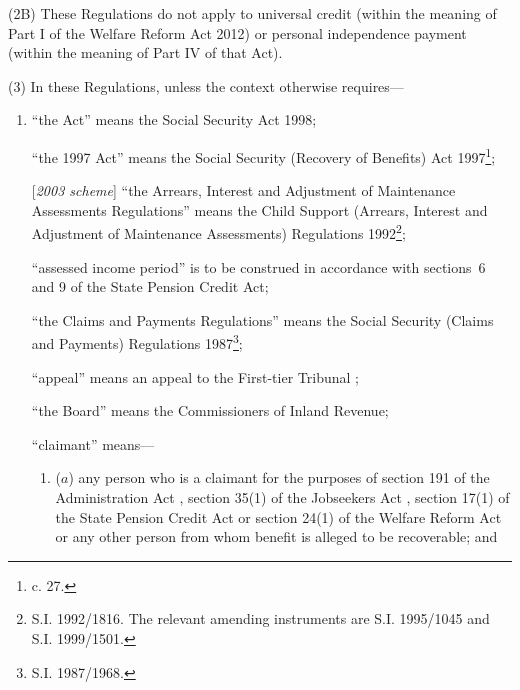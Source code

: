 \documentclass[12pt,a4paper]{article}
\begin{document}
(2B) These Regulations do not apply to universal credit (within the meaning of Part I of the Welfare Reform Act 2012) or personal independence payment (within the meaning of Part IV of that Act).

(3) In these Regulations, unless the context otherwise requires—
\begin{enumerate}\item[]
“the Act” means the Social Security Act 1998;

“the 1997 Act” means the Social Security (Recovery of Benefits) Act 1997\footnote{ c. 27.};

[\emph{2003 scheme}] “the Arrears, Interest and Adjustment of Maintenance Assessments Regulations” means the Child Support (Arrears, Interest and Adjustment of Maintenance Assessments) Regulations 1992\footnote{\frenchspacing S.I. 1992/1816. The relevant amending instruments are S.I. 1995/1045 and S.I. 1999/1501.};

“assessed income period” is to be construed in accordance with sections~6 and 9 of the State Pension Credit Act;

“the Claims and Payments Regulations” means the Social Security (Claims and Payments) Regulations 1987\footnote{\frenchspacing S.I. 1987/1968.};

“appeal” means an appeal to 
the First-tier Tribunal%
;

“the Board” means the Commissioners of Inland Revenue;

“claimant” means—
\begin{enumerate}\item[]
($a$) any person who is a claimant for the purposes of section 191 of the Administration Act%
, section 35(1) of the Jobseekers Act%
, section 17(1) of the State Pension Credit Act or section 24(1) of the Welfare Reform Act  %
or any other person from whom benefit is alleged to be recoverable; and


\end{enumerate}
\end{enumerate}
\end{document}
